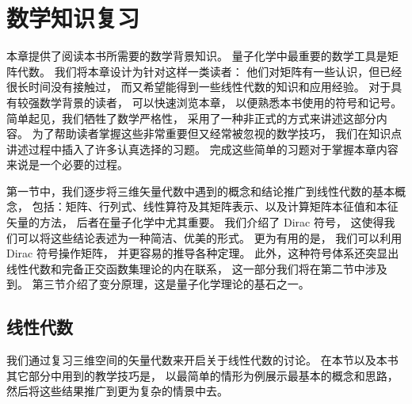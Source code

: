 
\chapter{数学知识复习}
\label{ch:1}

本章提供了阅读本书所需要的数学背景知识。
量子化学中最重要的数学工具是矩阵代数。
我们将本章设计为针对这样一类读者：
他们对矩阵有一些认识，但已经很长时间没有接触过，
而又希望能得到一些线性代数的知识和应用经验。
对于具有较强数学背景的读者，
可以快速浏览本章，
以便熟悉本书使用的符号和记号。
简单起见，我们牺牲了数学严格性，
采用了一种非正式的方式来讲述这部分内容。
为了帮助读者掌握这些非常重要但又经常被忽视的数学技巧，
我们在知识点讲述过程中插入了许多认真选择的习题。
完成这些简单的习题对于掌握本章内容来说是一个必要的过程。

第一节中，我们逐步将三维矢量代数中遇到的概念和结论推广到线性代数的基本概念，
包括：矩阵、行列式、线性算符及其矩阵表示、以及计算矩阵本征值和本征矢量的方法，
后者在量子化学中尤其重要。
我们介绍了 Dirac 符号，
这使得我们可以将这些结论表述为一种简洁、优美的形式。
更为有用的是，
我们可以利用 Dirac 符号操作矩阵，
并更容易的推导各种定理。
此外，这种符号体系还突显出线性代数和完备正交函数集理论的内在联系，
这一部分我们将在第二节中涉及到。
第三节介绍了变分原理，这是量子化学理论的基石之一。

\section{线性代数}
\label{sec:1.1}

我们通过复习三维空间的矢量代数来开启关于线性代数的讨论。
在本节以及本书其它部分中用到的教学技巧是，
以最简单的情形为例展示最基本的概念和思路，
然后将这些结果推广到更为复杂的情景中去。

